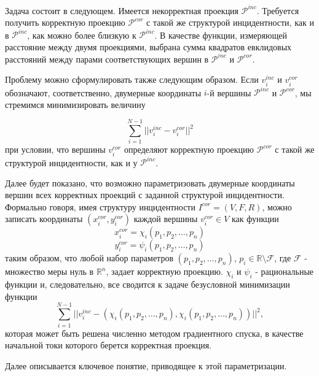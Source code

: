 \documentclass[a4paper,12pt, titlepage]{article}
\begin{document}
\begin{flushleft}
      Задача состоит в следующем. Имеется некорректная проекция $\mathcal{P}^{inc}$.
Требуется получить корректную проекцию $\mathcal{P}^{cor}$ с такой же структурой
инцидентности, как и в $\mathcal{P}^{inc}$, как можно более близкую к
$\mathcal{P}^{inc}$. В качестве функции, измеряющей расстояние между двумя проекциями,
выбрана сумма квадратов евклидовых расстояний между парами соответствующих вершин в 
$\mathcal{P}^{inc}$ и $\mathcal{P}^{cor}$.
\end{flushleft}

\begin{flushleft}
      Проблему можно сформулировать также следующим образом. Если $v_{i}^{inc}$ и 
$v_{i}^{cor}$ обозначают, соответственно, двумерные координаты $i$-й вершины 
$\mathcal{P}^{inc}$ и $\mathcal{P}^{cor}$, мы стремимся минимизировать величину

$$
\sum\limits_{i = 1}^{N - 1}||v_{i}^{inc} - v_{i}^{cor}||^{2}
$$
при условии, что вершины $v_{i}^{cor}$ определяют корректную проекцию $\mathcal{P}^{cor}$
с такой же структурой инцидентности, как и у $\mathcal{P}^{inc}$.
\end{flushleft}

\begin{flushleft}
      Далее будет показано, что возможно параметризовать двумерные координаты вершин
всех корректных проекций с заданной структурой инцидентности. Формально говоря, имея
структуру инцидентности $I^{cor} = (V, F, R)$, можно записать координаты 
$(x_{i}^{cor}, y_{i}^{cor})$ каждой вершины $v_{i}^{cor} \in V$ как функции
$$ x_{i}^{cor} = \chi_{i}(p_{1}, p_{2}, \ldots, p_{n})$$
$$ y_{i}^{cor} = \psi_{i}(p_{1}, p_{2}, \ldots, p_{n})$$
таким образом, что любой набор параметров $(p_{1}, p_{2}, \ldots, p_{n})$,
$p_{i} \in \mathbb{R} \setminus \mathcal{F}$, где $\mathcal{F}$ - множество меры нуль
в $\mathbb{R} ^ {n}$, задает корректную проекцию. $\chi_{i}$ и $\psi_{i}$ - рациональные
функции и, следовательно, все сводится к задаче безусловной минимизации функции
$$
\sum\limits_{i = 1}^{N - 1}||v_{i}^{inc} - 
(\chi_{i}(p_{1}, p_{2}, \ldots, p_{n}), \chi_{i}(p_{1}, p_{2}, \ldots, p_{n}))||^{2},
$$
которая может быть решена численно методом градиентного спуска, в качестве начальной токи 
которого берется корректная проекция.
\end{flushleft}

\begin{flushleft}
      Далее описывается ключевое понятие, приводящее к этой параметризации.
\end{flushleft}
\end{document}
